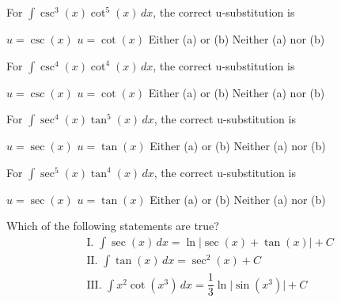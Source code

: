 \begin{questions}
    \question For $\int \csc^3 (x)\cot^5 (x) \, dx$, the correct u-substitution is \\

    \begin{oneparchoices}
        \choice $u = \csc (x)$
        \choice $u = \cot (x)$
        \choice Either (a) or (b) 
        \choice Neither (a) nor (b)
    \end{oneparchoices} \par \horizontalline

    \question For $\int \csc^4 (x)\cot^4 (x) \, dx$, the correct u-substitution is \\

    \begin{oneparchoices}
        \choice $u = \csc (x)$ 
        \choice $u = \cot (x)$
        \choice Either (a) or (b)
        \choice Neither (a) nor (b)
    \end{oneparchoices} \par \horizontalline

    \question For $\int \sec^4 (x)\tan^5 (x) \, dx$, the correct u-substitution is \\

    \begin{oneparchoices}
        \choice $u = \sec (x)$ 
        \choice $u = \tan (x)$
        \choice Either (a) or (b)
        \choice Neither (a) nor (b)
    \end{oneparchoices} \par \horizontalline

    \question For $\int \sec^5 (x)\tan^4 (x) \, dx$, the correct u-substitution is \\
    
    \begin{oneparchoices}
        \choice $u = \sec (x)$ 
        \choice $u = \tan (x)$
        \choice Either (a) or (b)
        \choice Neither (a) nor (b)
    \end{oneparchoices} \par \horizontalline

    \question Which of the following statements are true? \begin{align*}
        & \text{I. } \int \sec (x) \, dx = \ln |\sec (x) + \tan (x)| + C \\[11pt]
        & \text{II. } \int \tan (x) \, dx = \sec^2 (x) + C \\[11pt]
        & \text{III. } \int x^2\cot \left(x^3\right) \, dx = \dfrac{1}{3}\ln \bigg|\sin \left(x^3\right)\bigg| + C
    \end{align*}


\end{questions}
